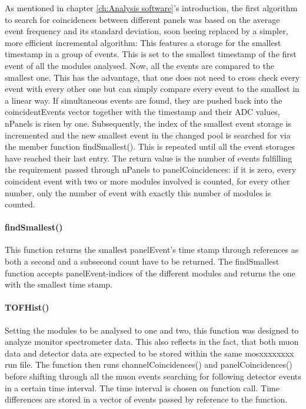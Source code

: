    As mentioned in chapter \ref{ch:Analysis software}'s introduction, the first algorithm to search for coincidences between different panels was based on the average event frequency and its standard deviation, soon beeing replaced by a simpler, more efficient incremental algorithm:
    This features a storage for the smallest timestamp in a group of events.  This is set to the smallest timestamp of the first event of all the modules analysed. Now, all the events are compared to the smallest one. This has the advantage, that one does not need to cross check every event with every other one but can simply compare every event to the smallest in a linear way. If simultaneous events are found, they are pushed back into the coincidentEvents vector together with the timestamp and their ADC values, nPanels is risen by one. Subsequently, the index of the smallest event storage is incremented and the new smallest event in the changed pool is searched for via the member function findSmallest(). This is repeated until all the event storages have reached their last entry.
    The return value is the number of events fulfilling the requirement passed through nPanels to panelCoincidences: if it is zero, every coincident event with two or more modules involved is counted, for every other number, only the number of event with exactly this number of modules is counted.

    \paragraph{findSmallest()}
    \label{ch:Analysis software:sec:methods of the class run:subsec:findSmallest()}
    
    This function returns the smallest panelEvent's time stamp through references as both a second and a subsecond count have to be returned. The findSmallest function accepts panelEvent-indices of the different modules and returns the one with the smallest time stamp. 
    
    \paragraph{TOFHist()}
    \label{ch:Analysis software:sec:methods of the class run:subsec:TOFHist()}
    
    Setting the modules to be analysed to one and two, this function was designed to analyze monitor spectrometer data. This also reflects in the fact, that both muon data and detector data are expected to be stored within the same mosxxxxxxxx run file. The function then runs channelCoincidences() and panelCoincidences() before shifting through all the muon events searching for following detector events in a certain time interval. The time interval is chosen on function call. Time differences are stored in a vector of events passed by reference to the function.
    
